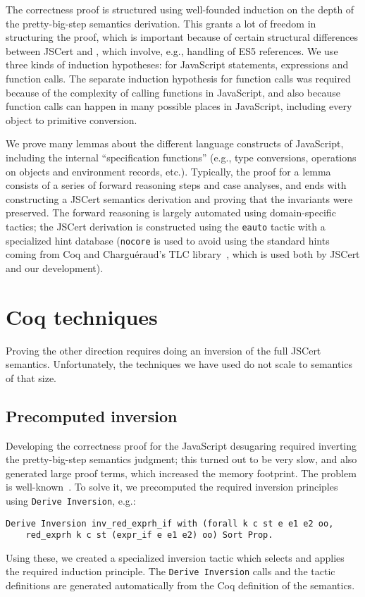 \documentclass{llncs}
\begin{document}
The correctness proof is structured using well-founded 
induction on the depth of the \lambdajs pretty-big-step
semantics derivation. This grants a lot of freedom in structuring
the proof, which is important because of certain structural
differences between JSCert and \lambdajs, which involve,
e.g., handling of ES5 references. We use three kinds of induction
hypotheses: for JavaScript statements, expressions and
function calls. The separate induction hypothesis for function
calls was required because of the complexity of calling functions
in JavaScript, and also because function calls can happen in
many possible places in JavaScript, including every
object to primitive conversion.

We prove many lemmas about the different language constructs
of JavaScript, including the internal ``specification functions''
(e.g., type conversions, operations on objects and environment
records, etc.). Typically, the proof for a lemma consists of
a series of forward reasoning steps and case analyses, and ends with
constructing a JSCert semantics derivation and proving that
the invariants were preserved. The forward reasoning is largely
automated using domain-specific tactics; the JSCert derivation
is constructed using the \texttt{eauto} tactic with a specialized
hint database (\texttt{nocore} is used to avoid using the standard
hints coming from Coq and Chargu\'eraud's TLC
library~\cite{TLC}, which is
used both by JSCert and our development).

\section{Coq techniques}
\label{sec:coq-techniques}

Proving the other direction requires doing an inversion of the full JSCert
semantics. Unfortunately, the techniques we have used do not scale to semantics
of that size.

\subsection{Precomputed inversion}

Developing the correctness proof for the JavaScript desugaring required
inverting the \lambdajs pretty-big-step semantics judgment; this
turned out to be very slow, and also generated large proof terms, which 
increased the memory footprint. The problem is well-known~\cite{Monin:Coq2}.
To solve it, we precomputed the required inversion principles
using \texttt{Derive Inversion}, e.g.:
\begin{verbatim}
Derive Inversion inv_red_exprh_if with (forall k c st e e1 e2 oo,
    red_exprh k c st (expr_if e e1 e2) oo) Sort Prop.
\end{verbatim}
Using these, we created a specialized inversion tactic
which selects and applies the required induction principle.
The \texttt{Derive Inversion} calls and the tactic definitions
are generated automatically from the Coq definition of the semantics.
\end{document}
